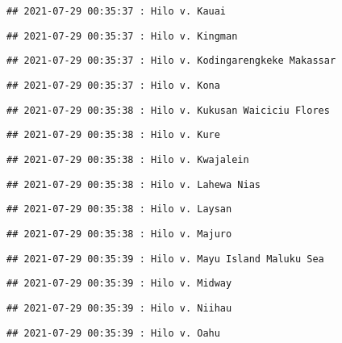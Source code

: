 \documentclass[
]{article}
\begin{document}
\begin{verbatim}
## 2021-07-29 00:35:37 : Hilo v. Kauai
\end{verbatim}

\begin{verbatim}
## 2021-07-29 00:35:37 : Hilo v. Kingman
\end{verbatim}

\begin{verbatim}
## 2021-07-29 00:35:37 : Hilo v. Kodingarengkeke Makassar
\end{verbatim}

\begin{verbatim}
## 2021-07-29 00:35:37 : Hilo v. Kona
\end{verbatim}

\begin{verbatim}
## 2021-07-29 00:35:38 : Hilo v. Kukusan Waiciciu Flores
\end{verbatim}

\begin{verbatim}
## 2021-07-29 00:35:38 : Hilo v. Kure
\end{verbatim}

\begin{verbatim}
## 2021-07-29 00:35:38 : Hilo v. Kwajalein
\end{verbatim}

\begin{verbatim}
## 2021-07-29 00:35:38 : Hilo v. Lahewa Nias
\end{verbatim}

\begin{verbatim}
## 2021-07-29 00:35:38 : Hilo v. Laysan
\end{verbatim}

\begin{verbatim}
## 2021-07-29 00:35:38 : Hilo v. Majuro
\end{verbatim}

\begin{verbatim}
## 2021-07-29 00:35:39 : Hilo v. Mayu Island Maluku Sea
\end{verbatim}

\begin{verbatim}
## 2021-07-29 00:35:39 : Hilo v. Midway
\end{verbatim}

\begin{verbatim}
## 2021-07-29 00:35:39 : Hilo v. Niihau
\end{verbatim}

\begin{verbatim}
## 2021-07-29 00:35:39 : Hilo v. Oahu
\end{verbatim}
\end{document}
